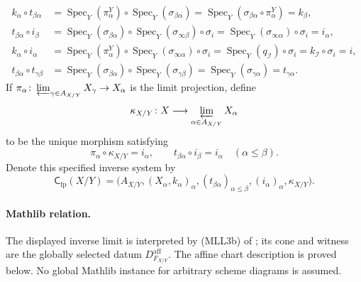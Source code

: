 \begin{definition}
  \[
  \begin{aligned}
    k_\alpha\circ t_{\beta\alpha}
      &=\operatorname{Spec}_Y(\pi_\alpha^Y)
        \circ\operatorname{Spec}_Y(\sigma_{\beta\alpha})
       =\operatorname{Spec}_Y(
          \sigma_{\beta\alpha}\circ\pi_\alpha^Y)=k_\beta,\\
    t_{\beta\alpha}\circ i_\beta
      &=\operatorname{Spec}_Y(\sigma_{\beta\alpha})
        \circ\operatorname{Spec}_Y(\sigma_{\infty\beta})
        \circ\sigma_i
       =\operatorname{Spec}_Y(\sigma_{\infty\alpha})
        \circ\sigma_i=i_\alpha,\\
    k_\alpha\circ i_\alpha
      &=\operatorname{Spec}_Y(\pi_\alpha^Y)
        \circ\operatorname{Spec}_Y(\sigma_{\infty\alpha})
        \circ\sigma_i
       =\operatorname{Spec}_Y(q_{\mathcal I})\circ\sigma_i
       =k_{\mathcal I}\circ\sigma_i=i,\\
    t_{\beta\alpha}\circ t_{\gamma\beta}
      &=\operatorname{Spec}_Y(\sigma_{\beta\alpha})
        \circ\operatorname{Spec}_Y(\sigma_{\gamma\beta})
       =\operatorname{Spec}_Y(\sigma_{\gamma\alpha})
       =t_{\gamma\alpha}.
  \end{aligned}                                                   \tag{120}
  \]
  If
  $\pi_\alpha\colon\varprojlim_{\gamma\in A_{X/Y}}X_\gamma\to X_\alpha$
  is the limit projection, define
  \[
    \kappa_{X/Y}\colon X\longrightarrow
      \varprojlim_{\alpha\in A_{X/Y}}X_\alpha
  \]
  to be the unique morphism satisfying
  \[
    \pi_\alpha\circ\kappa_{X/Y}=i_\alpha,
    \qquad
    t_{\beta\alpha}\circ i_\beta=i_\alpha
      \quad(\alpha\leq\beta).                                  \tag{121}
  \]
  Denote this specified inverse system by
  \[
    \mathsf C_{\mathrm{fp}}(X/Y)
      =\bigl(A_{X/Y},(X_\alpha,k_\alpha)_\alpha,
        (t_{\beta\alpha})_{\alpha\leq\beta},(i_\alpha)_\alpha,
        \kappa_{X/Y}\bigr).                                     \tag{122}
  \]

  \paragraph{Mathlib relation.}
  The displayed inverse limit is interpreted by
  (MLL3b) of
  ; its cone and
  \texttt{} witness are the
  globally selected datum $D_{F_{X/Y}}^{\mathrm{aff}}$.  The affine chart
  description is proved below.  No global Mathlib
  \texttt{} instance for arbitrary scheme diagrams is
  assumed.
\end{definition}

